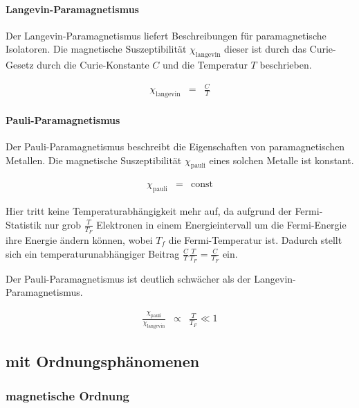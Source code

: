 \documentclass[12pt,a4paper]{scrartcl}
\numberwithin{equation}{section} %
\renewcommand{\[}{} %
\renewcommand{\]}{\noindent} %
\begin{document}
\hypertarget{langevin-paramagnetismus}{%
\paragraph{Langevin-Paramagnetismus}\label{langevin-paramagnetismus}}

Der Langevin-Paramagnetismus liefert Beschreibungen für paramagnetische
Isolatoren. Die magnetische Suszeptibilität \(\chi_\mathrm{langevin}\)
dieser ist durch das Curie-Gesetz durch die Curie-Konstante \(C\) und
die Temperatur \(T\) beschrieben.

\[
\begin{eqnarray}
    \chi_\mathrm{langevin} &=& \frac{C}{T}
\end{eqnarray}
\]

\hypertarget{pauli-paramagnetismus}{%
\paragraph{Pauli-Paramagnetismus}\label{pauli-paramagnetismus}}

Der Pauli-Paramagnetismus beschreibt die Eigenschaften von
paramagnetischen Metallen. Die magnetische Suszeptibilität
\(\chi_\mathrm{pauli}\) eines solchen Metalle ist konstant.

\[
\begin{eqnarray}
    \chi_\mathrm{pauli} &=& \mathrm{const}
\end{eqnarray}
\]

Hier tritt keine Temperaturabhängigkeit mehr auf, da aufgrund der
Fermi-Statistik nur grob \(\frac{T}{T_F}\) Elektronen in einem
Energieintervall um die Fermi-Energie ihre Energie ändern können, wobei
\(T_{f}\) die Fermi-Temperatur ist. Dadurch stellt sich ein
temperaturunabhängiger Beitrag
\(\frac{C}{T} \frac{T}{T_F} = \frac{C}{T_F}\) ein.

Der Pauli-Paramagnetismus ist deutlich schwächer als der
Langevin-Paramagnetismus.

\[
\begin{eqnarray}
    \frac{\chi_\mathrm{pauli}}{\chi_\mathrm{langevin}}
        &\propto& \frac{T}{T_F} \ll 1
\end{eqnarray}
\]

\hypertarget{mit-ordnungsphuxe4nomenen}{%
\subsection{mit Ordnungsphänomenen}\label{mit-ordnungsphuxe4nomenen}}

\hypertarget{magnetische-ordnung}{%
\subsubsection{magnetische Ordnung}\label{magnetische-ordnung}}
\end{document}
